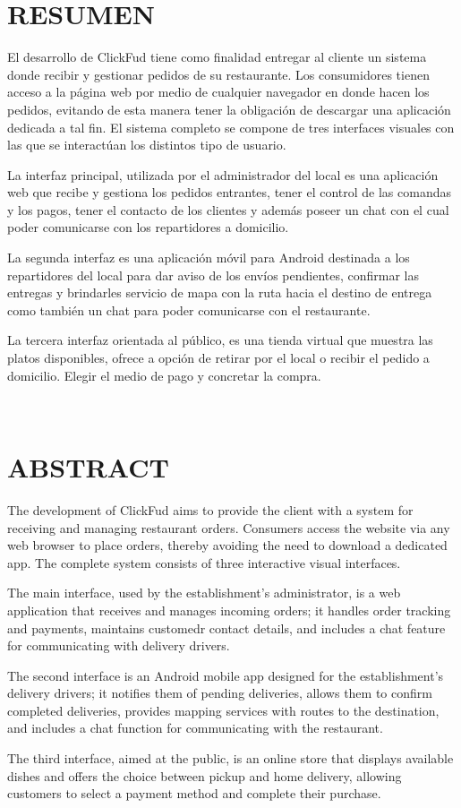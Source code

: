 \documentclass[12pt,a4paper]{report}
\begin{document}
\section*{\Huge RESUMEN}
\begin{justify}
El desarrollo de ClickFud  tiene como finalidad entregar al cliente un sistema donde recibir y gestionar pedidos de su restaurante. Los consumidores tienen acceso a la página web por medio de cualquier navegador en donde hacen los pedidos, evitando de esta manera tener la obligación de descargar una aplicación dedicada a tal fin. El sistema completo se compone de tres interfaces visuales con las que se interactúan los distintos tipo de usuario.

La interfaz principal, utilizada por el administrador del local es una aplicación web que recibe y gestiona los pedidos entrantes, tener el control de las comandas y los pagos, tener el contacto de los clientes y además poseer un chat con el cual poder comunicarse con los repartidores a domicilio.

La segunda interfaz es una aplicación móvil para Android destinada a los repartidores del local para dar aviso de los envíos pendientes, confirmar las entregas y brindarles servicio de mapa con la ruta hacia el destino de entrega como también un chat para poder comunicarse con el restaurante.

La tercera interfaz orientada al público, es una tienda virtual que muestra las platos disponibles, ofrece a opción de retirar por el local o recibir el pedido a domicilio. Elegir el medio de pago y concretar la compra.
\end{justify}
\newpage
~
\newpage

\section*{\Huge ABSTRACT}
\begin{justify}
The development of ClickFud aims to provide the client with a system for receiving and managing restaurant orders. Consumers access the website via any web browser to place orders, thereby avoiding the need to download a dedicated app. The complete system consists of three interactive visual interfaces.

The main interface, used by the establishment's administrator, is a web application that receives and manages incoming orders; it handles order tracking and payments, maintains customedr contact details, and includes a chat feature for communicating with delivery drivers.

The second interface is an Android mobile app designed for the establishment's delivery drivers; it notifies them of pending deliveries, allows them to confirm completed deliveries, provides mapping services with routes to the destination, and includes a chat function for communicating with the restaurant.

The third interface, aimed at the public, is an online store that displays available dishes and offers the choice between pickup and home delivery, allowing customers to select a payment method and complete their purchase.
\end{justify}
\newpage
~
\newpage
\end{document}

